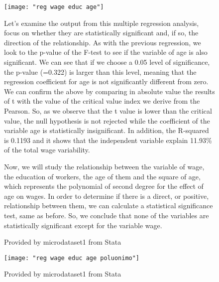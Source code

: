 \documentclass{article}
\begin{document}
\begin{figure}
	\begin{Center}
		\texttt{[image: "reg wage educ age"]}
		\caption{Provided by microdataset1 from Stata}
		\label{fig:reg-wage-educ-age}
	\end{Center}
	\vspace {0.5\baselineskip}
	
	Let’s examine the output from this multiple regression analysis, focus on whether they are statistically significant and, if so, the direction of the relationship. As with the previous regression, we look to the p-value of the F-test to see if the variable of age is also significant. We can see that if we choose a 0.05 level of significance, the p-value (=0.322) is larger than this level, meaning that the regression coefficient for age is not significantly different from zero. We can confirm the above by comparing in absolute value the results of t with the value of the critical value index we derive from the Pearson. So, as we observe that the t value is lower than the critical value, the null hypothesis is not rejected while the coefficient of the variable age is statistically insignificant. In addition, the R-squared is 0.1193 and it shows that the independent variable explain 11.93\% of the total wage variability.
	\vspace {0.5\baselineskip}
	
	Now, we will study the relationship between the variable of wage, the education of workers, the age of them and the square of age, which represents the polynomial of second degree for the effect of age on wages. In order to determine if there is a direct, or positive, relationship between them, we can calculate a statistical significance test, same as before. So, we conclude that none of the variables are statistically significant except for the variable wage.
\end{figure}

\begin{figure}
	\begin{Center}
	\texttt{[image: "reg wage educ age poluonimo"]}
	\caption{Provided by microdataset1 from Stata}
	\label{fig:reg-wage-educ-age-poluonimo}
	\end{Center}
\end{figure}
\end{document}
